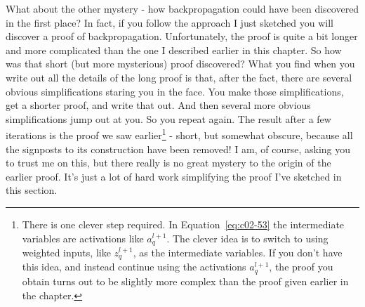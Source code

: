 What about the other mystery - how backpropagation could have been discovered in the first place? In fact, if you follow the approach I just sketched you will discover a proof of backpropagation. Unfortunately, the proof is quite a bit longer and more complicated than the one I described earlier in this chapter. So how was that short (but more mysterious) proof discovered? What you find when you write out all the details of the long proof is that, after the fact, there are several obvious simplifications staring you in the face. You make those simplifications, get a shorter proof, and write that out. And then several more obvious simplifications jump out at you. So you repeat again. The result after a few iterations is the proof we saw earlier\footnote{There is one clever step required. In Equation~\ref{eq:c02-53} the intermediate variables are activations like $a^{l+1}_q$. The clever idea is to switch to using weighted inputs, like $z^{l+1}_q$, as the intermediate variables. If you don't have this idea, and instead continue using the activations $a^{l+1}_q$, the proof you obtain turns out to be slightly more complex than the proof given earlier in the chapter.} - short, but somewhat obscure, because all the signposts to its construction have been removed! I am, of course, asking you to trust me on this, but there really is no great mystery to the origin of the earlier proof. It's just a lot of hard work simplifying the proof I've sketched in this section.
